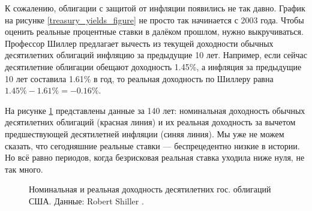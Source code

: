 К сожалению, облигации с защитой от инфляции появились не так давно. График на 
рисунке \ref{treasury_yields_figure} не просто так начинается с 2003 года. 
Чтобы оценить реальные процентные ставки в далёком прошлом, нужно 
выкручиваться. Профессор Шиллер предлагает вычесть из текущей доходности 
обычных десятилетних облигаций инфляцию за предыдущие 10 лет. Например, если 
сейчас десятилетние облигации обещают доходность 1.45\%, а инфляция за 
предыдущие 10 лет составила 1.61\% в год, то реальная доходность по Шиллеру 
равна $1.45\% - 1.61\% = -0.16\%$.

На рисунке \ref{long_run_interest_rates} представлены данные за 140 лет: 
номинальная доходность обычных десятилетних облигаций (красная линия) и их 
реальная доходность за вычетом предшествующей десятилетней инфляции (синяя 
линия). Мы уже не можем сказать, что сегодняшние реальные ставки 
--- беспрецедентно низкие в истории. Но всё равно периодов, когда безрисковая 
реальная ставка уходила ниже нуля, не так много.



\begin{figure}[ht]
\centering
{}
\caption{Номинальная и реальная доходность десятилетних гос. облигаций США. 
Данные: Robert Shiller \cite{shillerOnline}.}
\label{long_run_interest_rates}
\end{figure}

